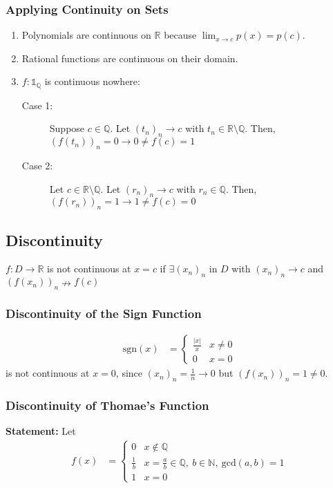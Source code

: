 \documentclass[10pt]{extarticle}
\newcommand{\N}{\mathbb{N}}
\newcommand{\Q}{\mathbb{Q}}
\newcommand{\R}{\mathbb{R}}
\begin{document}
    \subsubsection{Applying Continuity on Sets}%
    \begin{enumerate}[(1)]
      \item Polynomials are continuous on $\R$ because $\lim_{x\rightarrow c}p(x) = p(c)$.
      \item Rational functions are continuous on their domain.
      \item $f: \mathbb{1}_{\Q}$ is continuous nowhere:
        \begin{description}
          \item[Case 1:] Suppose $c \in \Q$. Let $(t_n)_n \rightarrow c$ with $t_n \in \R\setminus \Q$. Then, $(f(t_n))_n = 0 \rightarrow 0 \neq f(c) = 1$
          \item[Case 2:] Let $c\in \R \setminus \Q$. Let $(r_n)_n \rightarrow c$ with $r_n \in \Q$. Then, $(f(r_n))_n = 1 \rightarrow 1 \neq f(c) = 0$
        \end{description}
    \end{enumerate}
  \subsection{Discontinuity}%
    $f: D\rightarrow \R$ is not continuous at $x = c$ if $\exists (x_n)_n$ in $D$ with $(x_n)_n \rightarrow c$ and $(f(x_n))_n \nrightarrow f(c)$
    \subsubsection{Discontinuity of the Sign Function}%
    \begin{align*}
      \text{sgn}(x) &= \begin{cases}
        \frac{|x|}{x} & x\neq 0\\
        0 & x = 0
      \end{cases}
    \end{align*}
    is not continuous at $x = 0$, since $(x_n)_n = \frac{1}{n} \rightarrow 0$ but $(f(x_n))_n = 1 \neq 0$.
    \subsubsection{Discontinuity of Thomae's Function}%
    \textbf{Statement:} Let
    \begin{align*}
      f(x) &= \begin{cases}
        0 & x\notin \Q\\
        \frac{1}{b} & x = \frac{a}{b}\in\Q,~b\in\N,~\text{gcd}(a,b)=1\\
        1 & x = 0
      \end{cases}
    \end{align*}
\end{document}
